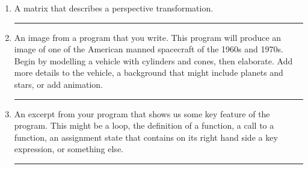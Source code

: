 \documentclass[oneside]{article}
\newenvironment{answer}
  {\vspace*{0.2cm} \rule{12cm}{0.02cm} \vspace*{0.2cm}}
  {\vspace*{0.2cm}}
\begin{document}
\begin{enumerate}
\begin{answer}
\end{answer}

\item A matrix that describes a perspective transformation.

\begin{answer}

\end{answer}

\item An image from a program that you write. This program will produce an image of one of the American manned spacecraft of the 1960s and 1970s. Begin by modelling a vehicle with cylinders and cones, then elaborate. Add more details to the vehicle, a background that might include planets and stars, or add animation.

\begin{answer}

\end{answer}

\item An excerpt from your program that shows us some key feature of the program. This might be a loop, the definition of a function, a call to a function, an assignment state that contains on its right hand side a key expression, or something else.

\begin{answer}

\end{answer}

\end{enumerate}
\end{document}
